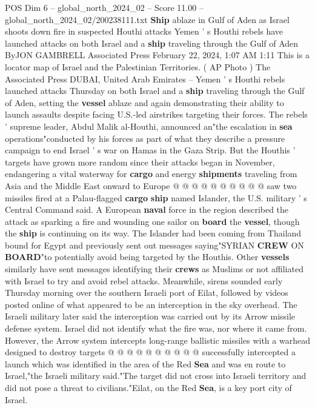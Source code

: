 \begin{textsample}{POS Dim 6 – global\_north\_2024\_02 – Score 11.00 – global\_north\_2024\_02/200238111.txt}  \label{ex:f6_pos_171}
\textbf{Ship} ablaze in Gulf of Aden as Israel shoots down fire in suspected Houthi attacks Yemen ' s Houthi rebels have launched attacks on both Israel and a \textbf{ship} traveling through the Gulf of Aden ByJON GAMBRELL Associated Press February 22, 2024, 1:07 AM 1:11 This is a locator map of Israel and the Palestinian Territories. ( AP Photo ) The Associated Press DUBAI, United Arab Emirates -- Yemen ' s Houthi rebels launched attacks Thursday on both Israel and a \textbf{ship} traveling through the Gulf of Aden, setting the \textbf{vessel} ablaze and again demonstrating their ability to launch assaults despite facing U.S.-led airstrikes targeting their forces.
The rebels ' supreme leader, Abdul Malik al-Houthi, announced an"the escalation in \textbf{sea} operations"conducted by his forces as part of what they describe a pressure campaign to end Israel ' s war on Hamas in the Gaza Strip.
But the Houthis ' targets have grown more random since their attacks began in November, endangering a vital waterway for \textbf{cargo} and energy \textbf{shipments} traveling from Asia and the Middle East onward to Europe @ @ @ @ @ @ @ @ @ @ saw two missiles fired at a Palau-flagged \textbf{cargo} \textbf{ship} named Islander, the U.S. military ' s Central Command said.
A European \textbf{naval} force in the region described the attack as sparking a fire and wounding one sailor on \textbf{board} the \textbf{vessel}, though the \textbf{ship} is continuing on its way.
The Islander had been coming from Thailand bound for Egypt and previously sent out messages saying"SYRIAN \textbf{CREW} ON \textbf{BOARD}"to potentially avoid being targeted by the Houthis.
Other \textbf{vessels} similarly have sent messages identifying their \textbf{crews} as Muslims or not affiliated with Israel to try and avoid rebel attacks.
Meanwhile, sirens sounded early Thursday morning over the southern Israeli port of Eilat, followed by videos posted online of what appeared to be an interception in the sky overhead.
The Israeli military later said the interception was carried out by its Arrow missile defense system.
Israel did not identify what the fire was, nor where it came from.
However, the Arrow system intercepts long-range ballistic missiles with a warhead designed to destroy targets @ @ @ @ @ @ @ @ @ @ successfully intercepted a launch which was identified in the area of the Red \textbf{Sea} and was en route to Israel,"the Israeli military said."The target did not cross into Israeli territory and did not pose a threat to civilians."Eilat, on the Red \textbf{Sea}, is a key port city of Israel.

\end{textsample}
